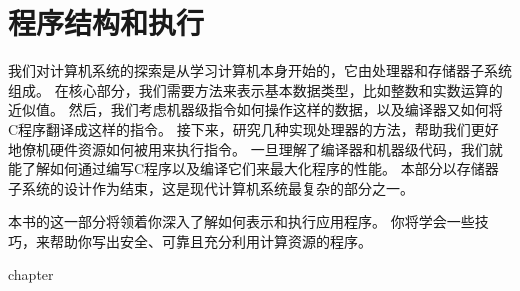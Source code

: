 \part{程序结构和执行}
{
    我们对计算机系统的探索是从学习计算机本身开始的，它由处理器和存储器子系统组成。
    在核心部分，我们需要方法来表示基本数据类型，比如整数和实数运算的近似值。
    然后，我们考虑机器级指令如何操作这样的数据，以及编译器又如何将C程序翻译成这样的指令。
    接下来，研究几种实现处理器的方法，帮助我们更好地僚机硬件资源如何被用来执行指令。
    一旦理解了编译器和机器级代码，我们就能了解如何通过编写C程序以及编译它们来最大化程序的性能。
    本部分以存储器子系统的设计作为结束，这是现代计算机系统最复杂的部分之一。

    本书的这一部分将领着你深入了解如何表示和执行应用程序。
    你将学会一些技巧，来帮助你写出安全、可靠且充分利用计算资源的程序。

    {chapter}
}

\cleardoublepage

\endinput